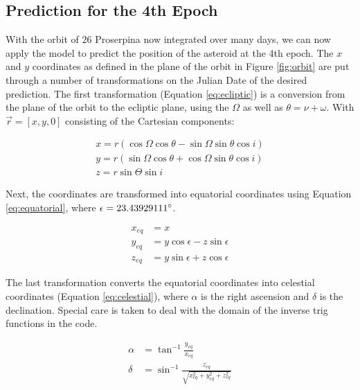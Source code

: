 \documentclass{article}
\begin{document}
\subsection{Prediction for the 4th Epoch}
With the orbit of 26 Proserpina now integrated over many days, we can now apply the model to predict the position of the asteroid at the 4th epoch. The $x$ and $y$ coordinates as 
defined in the plane of the orbit in Figure \ref{fig:orbit} are put through a number of transformations on the Julian Date of the desired prediction. The first transformation (Equation \ref{eq:ecliptic})
is a conversion from the plane of the orbit to the ecliptic plane, using the $\Omega$ as well as $\theta = \nu + \omega$. With $\vec{r} = [x, y, 0]$ consisting of the Cartesian components:

\begin{equation}
    \label{eq:ecliptic}
    \begin{aligned}
        x = r(\cos\Omega\cos\theta - \sin\Omega\sin\theta\cos i) \\
        y = r(\sin\Omega\cos\theta + \cos\Omega\sin\theta\cos i) \\
        z = r\sin\Theta\sin i
    \end{aligned}
\end{equation}

\noindent
Next, the coordinates are transformed into equatorial coordinates using Equation \ref{eq:equatorial}, where $\epsilon = 23.43929111 \degree$.

\begin{equation}
    \label{eq:equatorial}
    \begin{aligned}
        x_{eq} &= x \\
        y_{eq} &= y\cos\epsilon - z\sin\epsilon \\
        z_{eq} &= y\sin\epsilon + z\cos\epsilon
    \end{aligned}
\end{equation}

\noindent 
The last transformation converts the equatorial coordinates into celestial coordinates (Equation \ref{eq:celestial}), where $\alpha$ is the right ascension and $\delta$ is the declination. 
Special care is taken to deal with the domain of the inverse trig functions in the code.

\begin{equation}
    \label{eq:celestial}
    \begin{aligned}
        \alpha &= \tan^{-1}\frac{y_{eq}}{x_{eq}} \\
        \delta &= \sin^{-1}\frac{z_{eq}}{\sqrt{x_{eq}^2 + y_{eq}^2 + z_{eq}^2}}
    \end{aligned}
\end{equation}
\end{document}
